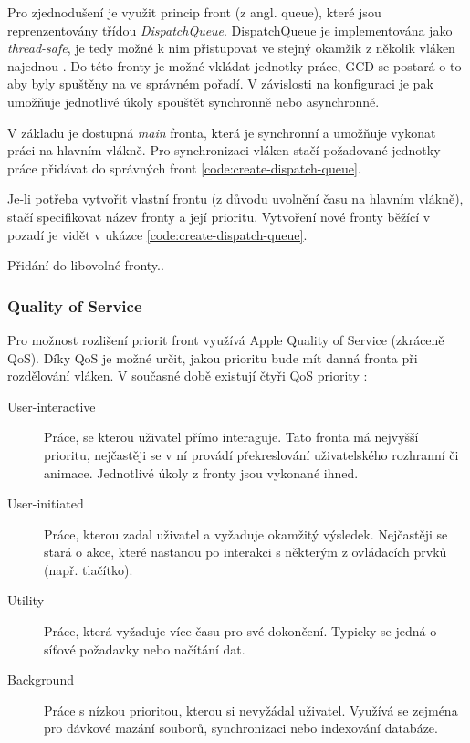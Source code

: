 Pro zjednodušení je využit princip front (z angl. queue), které jsou reprenzentovány třídou \textit{DispatchQueue}.
DispatchQueue je implementována jako \textit{thread-safe}, je tedy možné k nim přistupovat ve stejný okamžik z několik vláken najednou \cite{apple-concurrency-programming-guide}.
Do této fronty je možné vkládat jednotky práce, GCD se postará o to aby byly spuštěny na ve správném pořadí.
V závislosti na konfiguraci je pak umožňuje jednotlivé úkoly spouštět synchronně nebo asynchronně.

V základu je dostupná \textit{main} fronta, která je synchronní a umožňuje vykonat práci na hlavním vlákně.
Pro synchronizaci vláken stačí požadované jednotky práce přidávat do správných front  \ref{code:create-dispatch-queue}.

Je-li potřeba vytvořit vlastní frontu (z důvodu uvolnění času na hlavním vlákně), stačí specifikovat název fronty a její prioritu.
Vytvoření nové fronty běžící v pozadí je vidět v ukázce \ref{code:create-dispatch-queue}.


Přidání do libovolné fronty..

\subsubsection*{Quality of Service}

Pro možnost rozlišení priorit front využívá Apple Quality of Service (zkráceně QoS).
Díky QoS je možné určit, jakou prioritu bude mít danná fronta při rozdělování vláken.
V současné době existují čtyři QoS priority \cite{apple-prioritize-work-with-qos}:

\begin{description}
  \item[User-interactive] Práce, se kterou uživatel přímo interaguje.
  Tato fronta má nejvyšší prioritu, nejčastěji se v ní provádí překreslování uživatelského rozhranní či animace.
  Jednotlivé úkoly z fronty jsou vykonané ihned.
  \item[User-initiated] Práce, kterou zadal uživatel a vyžaduje okamžitý výsledek.
  Nejčastěji se stará o akce, které nastanou po interakci s některým z ovládacích prvků (např. tlačítko).
  \item[Utility] Práce, která vyžaduje více času pro své dokončení.
  Typicky se jedná o síťové požadavky nebo načítání dat.
  \item[Background] Práce s nízkou prioritou, kterou si nevyžádal uživatel.
  Využívá se zejména pro dávkové mazání souborů, synchronizaci nebo indexování databáze.
\end{description}

